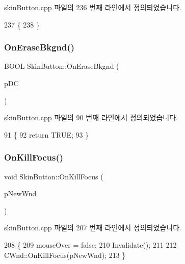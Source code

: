 skin\+Button.\+cpp 파일의 236 번째 라인에서 정의되었습니다.


\begin{DoxyCode}
237 \{
238 \}
\end{DoxyCode}
\mbox{\label{class_skin_button_ad046e6e663c72734fb1dc470d67f6ae0}} 
\subsubsection{\texorpdfstring{On\+Erase\+Bkgnd()}{OnEraseBkgnd()}}
{\footnotesize\ttfamily B\+O\+OL Skin\+Button\+::\+On\+Erase\+Bkgnd (\begin{DoxyParamCaption}\item[{C\+DC $\ast$}]{p\+DC }\end{DoxyParamCaption})\hspace{0.3cm}{\ttfamily [protected]}}



skin\+Button.\+cpp 파일의 90 번째 라인에서 정의되었습니다.


\begin{DoxyCode}
91 \{
92   \textcolor{keywordflow}{return} TRUE;
93 \}
\end{DoxyCode}
\mbox{\label{class_skin_button_ab89eac5d77588b47adfcbb9f664568be}} 
\subsubsection{\texorpdfstring{On\+Kill\+Focus()}{OnKillFocus()}}
{\footnotesize\ttfamily void Skin\+Button\+::\+On\+Kill\+Focus (\begin{DoxyParamCaption}\item[{C\+Wnd $\ast$}]{p\+New\+Wnd }\end{DoxyParamCaption})\hspace{0.3cm}{\ttfamily [protected]}}



skin\+Button.\+cpp 파일의 207 번째 라인에서 정의되었습니다.


\begin{DoxyCode}
208 \{
209   mouseOver = \textcolor{keyword}{false};
210   Invalidate();
211 
212   CWnd::OnKillFocus(pNewWnd);
213 \}
\end{DoxyCode}
\mbox{\label{class_skin_button_a824c7ad6169c7373af133b1df439a405}} 
